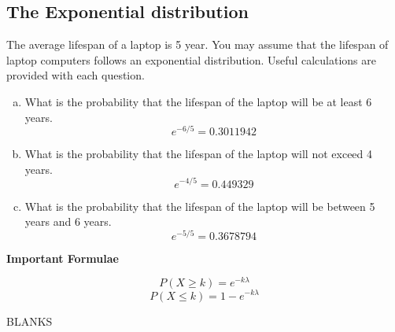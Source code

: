 \documentclass[a4paper,12pt]{article}
\begin{document}
\large 
\subsection*{The Exponential distribution}
The average lifespan of a laptop is 5 year. You may assume that the lifespan of laptop computers follows an exponential distribution. Useful calculations are provided with each question.

\begin{enumerate}[(a)]
	\item What is the probability that the lifespan of the laptop will be at least 6 years.
	\[e^{-6/5} = 0.3011942\]
	\medskip
	\item What is the probability that the lifespan of the laptop will not exceed 4 years.
	\[e^{-4/5} = 0.449329\]
	\medskip 
	\item What is the probability that the lifespan of the laptop will be between 5 years and 6 years.
	\[e^{-5/5} = 0.3678794\]
\end{enumerate}

\medskip 
\begin{framed}
\large 
\noindent \textbf{Important Formulae}

\[
P( X \geq k) =e^{-k \lambda }\]
\medskip 
\[
P( X \leq k) = 1 -e^{-k\lambda }\]
\end{framed}

\newpage 
	BLANKS
\end{document}

